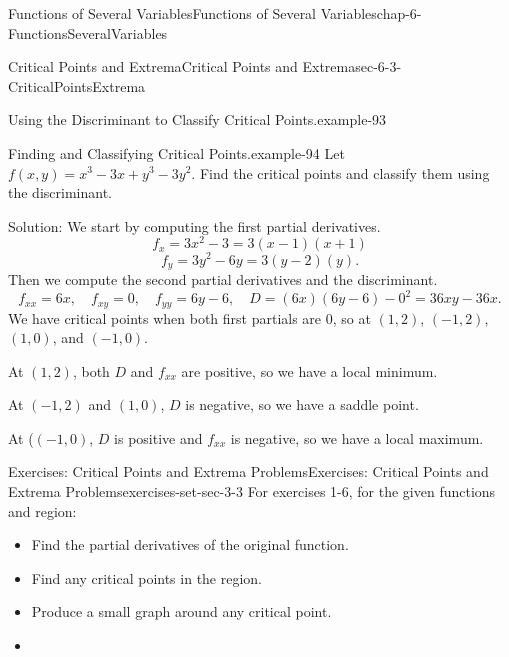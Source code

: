 \documentclass[oneside,10pt,]{book}
\numberwithin{equation}{section}
\begin{document}
\begin{chapterptx}{Functions of Several Variables}{}{Functions of Several Variables}{}{}{chap-6-FunctionsSeveralVariables}
\begin{sectionptx}{Critical Points and Extrema}{}{Critical Points and Extrema}{}{}{sec-6-3-CriticalPointsExtrema}
\begin{example}{Using the Discriminant to Classify Critical Points.}{example-93}
\end{example}
\begin{example}{Finding and Classifying Critical Points.}{example-94}%
\hypertarget{p-2373}{}%
Let \(f(x,y)=x^3-3x+y^3-3y^2\).  Find the critical points and classify them using the discriminant.%
\par
\hypertarget{p-2374}{}%
Solution:  We start by computing the first partial derivatives.%
%
\begin{equation*}
f_x=3x^2-3=3(x-1)(x+1)
\end{equation*}
%
\begin{equation*}
f_y=3y^2-6y=3(y-2)(y).
\end{equation*}
\hypertarget{p-2375}{}%
Then we compute the second partial derivatives and the discriminant.%
%
\begin{equation*}
f_{xx}=6x,\quad f_{xy}=0,\quad f_{yy}=6y-6,\quad D=(6x)(6y-6)-0^2=36xy-36x.
\end{equation*}
\hypertarget{p-2376}{}%
We have critical points when both first partials are 0, so at \((1,2)\), \((-1,2)\), \((1,0)\), and \((-1,0)\).%
\par
\hypertarget{p-2377}{}%
At \((1,2)\), both \(D\) and \(f_{xx}\) are positive, so we have a local minimum.%
\par
\hypertarget{p-2378}{}%
At \((-1,2)\) and \((1,0)\), \(D\) is negative, so we have a saddle point.%
\par
\hypertarget{p-2379}{}%
At (\((-1,0)\), \(D\) is positive and \(f_{xx}\) is negative, so we have a local maximum.%
\end{example}
%
%
\typeout{************************************************}
\typeout{************************************************}
%
\begin{exercises-subsection-numberless}{Exercises: Critical Points and Extrema Problems}{}{Exercises: Critical Points and Extrema Problems}{}{}{exercises-set-sec-3-3}
\hypertarget{p-2380}{}%
For exercises 1-6, for the given functions and region:%
\leavevmode%
\begin{itemize}[label=\textbullet]
\item{}\hypertarget{p-2381}{}%
Find the partial derivatives of the original function.%
\item{}\hypertarget{p-2382}{}%
Find any critical points in the region.%
\item{}\hypertarget{p-2383}{}%
Produce a small graph around any critical point.%
\item{}\hypertarget{p-2384}{}%

\end{itemize}
\end{exercises-subsection-numberless}
\end{sectionptx}
\end{chapterptx}
\end{document}
